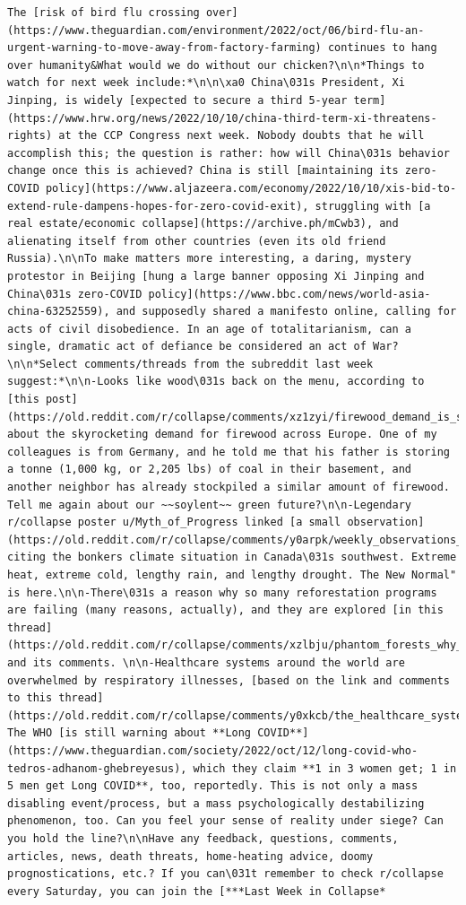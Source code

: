 \documentclass[
  letterpaper,
  DIV=11,
  numbers=noendperiod]{scrreprt}
\begin{document}
\begin{verbatim}
The [risk of bird flu crossing over](https://www.theguardian.com/environment/2022/oct/06/bird-flu-an-urgent-warning-to-move-away-from-factory-farming) continues to hang over humanity&What would we do without our chicken?\n\n*Things to watch for next week include:*\n\n\xa0 China\031s President, Xi Jinping, is widely [expected to secure a third 5-year term](https://www.hrw.org/news/2022/10/10/china-third-term-xi-threatens-rights) at the CCP Congress next week. Nobody doubts that he will accomplish this; the question is rather: how will China\031s behavior change once this is achieved? China is still [maintaining its zero-COVID policy](https://www.aljazeera.com/economy/2022/10/10/xis-bid-to-extend-rule-dampens-hopes-for-zero-covid-exit), struggling with [a real estate/economic collapse](https://archive.ph/mCwb3), and alienating itself from other countries (even its old friend Russia).\n\nTo make matters more interesting, a daring, mystery protestor in Beijing [hung a large banner opposing Xi Jinping and China\031s zero-COVID policy](https://www.bbc.com/news/world-asia-china-63252559), and supposedly shared a manifesto online, calling for acts of civil disobedience. In an age of totalitarianism, can a single, dramatic act of defiance be considered an act of War?\n\n*Select comments/threads from the subreddit last week suggest:*\n\n-Looks like wood\031s back on the menu, according to [this post](https://old.reddit.com/r/collapse/comments/xz1zyi/firewood_demand_is_surging_as_europeans_return_to/) about the skyrocketing demand for firewood across Europe. One of my colleagues is from Germany, and he told me that his father is storing a tonne (1,000 kg, or 2,205 lbs) of coal in their basement, and another neighbor has already stockpiled a similar amount of firewood. Tell me again about our ~~soylent~~ green future?\n\n-Legendary r/collapse poster u/Myth_of_Progress linked [a small observation](https://old.reddit.com/r/collapse/comments/y0arpk/weekly_observations_what_signs_of_collapse_do_you/is5odpk/) citing the bonkers climate situation in Canada\031s southwest. Extreme heat, extreme cold, lengthy rain, and lengthy drought. The New Normal" is here.\n\n-There\031s a reason why so many reforestation programs are failing (many reasons, actually), and they are explored [in this thread](https://old.reddit.com/r/collapse/comments/xzlbju/phantom_forests_why_ambitious_tree_planting/) and its comments. \n\n-Healthcare systems around the world are overwhelmed by respiratory illnesses, [based on the link and comments to this thread](https://old.reddit.com/r/collapse/comments/y0xkcb/the_healthcare_system_is_under_stress_from/). The WHO [is still warning about **Long COVID**](https://www.theguardian.com/society/2022/oct/12/long-covid-who-tedros-adhanom-ghebreyesus), which they claim **1 in 3 women get; 1 in 5 men get Long COVID**, too, reportedly. This is not only a mass disabling event/process, but a mass psychologically destabilizing phenomenon, too. Can you feel your sense of reality under siege? Can you hold the line?\n\nHave any feedback, questions, comments, articles, news, death threats, home-heating advice, doomy prognostications, etc.? If you can\031t remember to check r/collapse every Saturday, you can join the [***Last Week in Collapse* 
\end{verbatim}
\end{document}
